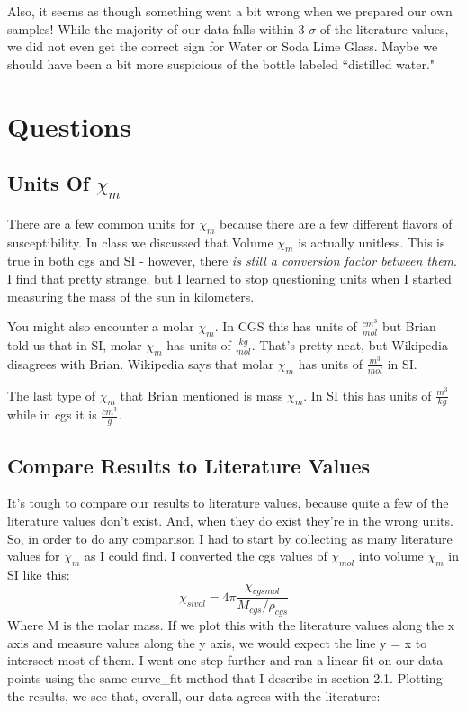 \documentclass{article}
\begin{document}
Also, it seems as though something went a bit wrong when we prepared our own
samples! While the majority of our data falls within 3 $\sigma$ of the
literature values, we did not even get the correct sign for Water or Soda Lime
Glass. Maybe we should have been a bit more suspicious of the bottle labeled
``distilled water."



\section{Questions}
\subsection{Units Of $\chi_m$}

There are a few common units for $\chi_m$ because there are a few different
flavors of susceptibility. In class we discussed that Volume $\chi_m$ is
actually unitless. This is true in both cgs and SI - however, there \textit{is
    still a conversion factor between them}. I find that pretty strange, but I
learned to stop questioning units when I started measuring the mass of the sun
in kilometers.

You might also encounter a molar $\chi_m$. In CGS this has units of
$\frac{cm^3}{mol}$ but Brian told us that in SI, molar $\chi_m$ has units of
$\frac{kg}{mol}$. That's pretty neat, but Wikipedia disagrees with Brian.
Wikipedia says that molar $\chi_m$ has units of $\frac{m^3}{mol}$ in SI.

The last type of $\chi_m$ that Brian mentioned is mass $\chi_m$. In SI this has
units of $\frac{m^3}{kg}$ while in cgs it is $\frac{cm^3}{g}$.

\subsection{Compare Results to Literature Values}
It's tough to compare our results to literature values, because quite a few of
the literature values don't exist. And, when they do exist they're in the wrong
units. So, in order to do any comparison I had to start by collecting as many
literature values for $\chi_m$ as I could find. I converted the cgs values of
$\chi_{mol}$ into volume $\chi_m$ in SI like this:
$$\chi_{sivol} = 4 \pi\frac{\chi_{cgsmol}}{M_{cgs} / \rho_{cgs}} $$
Where M is the molar mass. If we plot this with the literature values along the
x axis and measure values along the y axis, we would expect the line y = x to
intersect most of them. I went one step further and ran a linear fit on our
data points using the same curve\_fit method that I describe in section 2.1.
Plotting the results, we see that, overall, our data agrees with the
literature:
\end{document}
